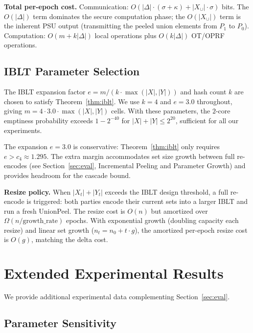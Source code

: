 \documentclass[letterpaper,twocolumn,10pt]{article}
\theoremstyle{definition}
\begin{document}
\smallskip\noindent\textbf{Total per-epoch cost.}
Communication: $O(|\Delta| \cdot (\sigma + \kappa) + |X_{\cup}| \cdot
\sigma)$ bits. The $O(|\Delta|)$ term dominates the secure computation
phase; the $O(|X_{\cup}|)$ term is the inherent PSU output (transmitting the
peeled union elements from $P_1$ to $P_0$). Computation: $O(m + k|\Delta|)$
local operations plus $O(k|\Delta|)$ OT/OPRF operations.

\subsection{IBLT Parameter Selection}

The IBLT expansion factor $e = m/(k \cdot \max(|X|, |Y|))$ and hash count
$k$ are chosen to satisfy Theorem~\ref{thm:iblt}. We use $k = 4$ and
$e = 3.0$ throughout, giving $m = 4 \cdot 3.0 \cdot \max(|X|, |Y|)$ cells.
With these parameters, the $2$-core emptiness probability exceeds
$1 - 2^{-40}$ for $|X| + |Y| \leq 2^{20}$, sufficient for all our
experiments.

The expansion $e = 3.0$ is conservative: Theorem~\ref{thm:iblt} only requires
$e > c_4 \approx 1.295$. The extra margin accommodates set size growth between
full re-encodes (see Section~\ref{sec:eval}, Incremental Peeling and Parameter
Growth) and provides headroom for the cascade bound.

\smallskip\noindent\textbf{Resize policy.}
When $|X_t| + |Y_t|$ exceeds the IBLT design threshold, a full re-encode is
triggered: both parties encode their current sets into a larger IBLT and run
a fresh UnionPeel. The resize cost is $O(n)$ but amortized over
$\Omega(n/\text{growth\_rate})$ epochs. With exponential growth (doubling
capacity each resize) and linear set growth ($n_t = n_0 + t \cdot g$), the
amortized per-epoch resize cost is $O(g)$, matching the delta cost.

\section{Extended Experimental Results}
\label{sec:ext-eval}

We provide additional experimental data complementing
Section~\ref{sec:eval}.

\subsection{Parameter Sensitivity}
\end{document}

